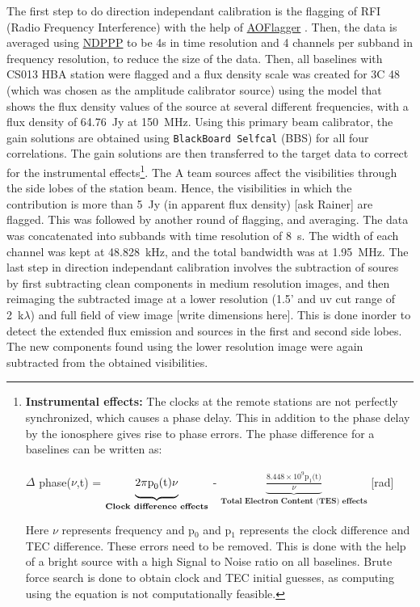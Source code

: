 \documentclass[../main/thesis_msc.tex]{subfiles}
\begin{document}
The first step to do direction independant calibration is the flagging of RFI (Radio Frequency Interference) with the help of \href{https://sourceforge.net/projects/aoflagger/}{AOFlagger} \citep{aoflagger}. Then, the data is averaged using \href{https://www.astron.nl/lofarwiki/doku.php?id=public:user_software:documentation:ndppp}{NDPPP} to be 4s in time resolution and 4 channels per subband in frequency resolution, to reduce the size of the data. Then, all baselines with CS013 HBA station were flagged and a flux density scale was created for 3C 48 (which was chosen as the amplitude calibrator source) using the model that shows the flux density values of the source at several different frequencies, with a flux density of 64.76~Jy at 150~MHz. Using this primary beam calibrator, the gain solutions are obtained using \verb|BlackBoard Selfcal| (BBS) for all four correlations. The gain solutions are then transferred to the target\citep{BBS} data to correct for the instrumental effects\footnote{\textbf{Instrumental effects:}  The clocks at the remote stations are not perfectly synchronized, which causes a phase delay. This in addition to the phase delay by the ionosphere gives rise to phase errors. The phase difference for a baselines can be written as: \begin{center}
$\Delta$ phase($\nu$,t) =  $\underbrace{ \vphantom{\frac{8.448 \times 10^9 \textrm{p}_1 \textrm{(t)}}{\nu}} 2\pi \textrm{p}_0\textrm{(t)} \nu}_{\textbf{Clock difference effects}}$ - $\underbrace{\frac{8.448 \times 10^9 \textrm{p}_1 \textrm{(t)}}{\nu}}_{\textbf{Total Electron Content (TES) effects}}$ [rad] \end{center} Here $\nu$ represents frequency and p$_0$ and p$_1$ represents the clock difference and TEC difference. These errors need to be removed. This is done with the help of a bright source with a high Signal to Noise ratio on all baselines. Brute force search is done to obtain clock and TEC initial guesses, as computing using the equation is not computationally feasible.}. The A team sources affect the visibilities through the side lobes of the station beam. Hence, the visibilities in which the contribution is more than 5~Jy (in apparent flux density) [ask Rainer] are flagged. This was followed by another round of flagging, and averaging. The data was concatenated into subbands with time resolution of 8~s. The width of each channel was kept at 48.828~kHz, and the total bandwidth was at 1.95~MHz. The last step in direction independant calibration involves the subtraction of soures by first subtracting clean components in medium resolution images, and then reimaging the subtracted image at a lower resolution (1.5' and uv cut range of 2~k$\lambda$) and full field of view image [write dimensions here]. This is done inorder to detect the extended flux emission and sources in the first and second side lobes. The new components found using the lower resolution image were again subtracted  from the obtained visibilities. 
\end{document}
